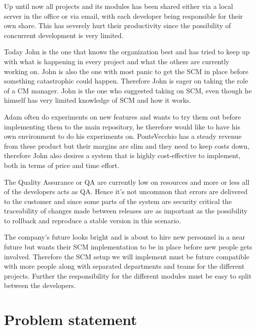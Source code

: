 \documentclass[10pt]{article}
\begin{document}
\noindent Up until now all projects and its modules has been shared either via a local server in the office or via email, with each developer being responsible for their own share. This has severely hurt their productivity since the possibility of concurrent development is very limited. 

\noindent Today John is the one that knows the organization best and has tried to keep up with what is happening in every project and what the others are currently working on. John is also the one with most panic to get the SCM in place before something catastrophic could happen. Therefore John is eager on taking the role of a CM manager. John is the one who suggested taking on SCM, even though he himself has very limited knowledge of SCM and how it works.

\noindent Adam often do experiments on new features and wants to try them out before implementing them to the main repository, he therefore would like to have his own environment to do his experiments on. PonteVecchio has a steady revenue from these product but their margins are slim and they need to keep costs down, therefore John also desires a system that is highly cost-effective to implement, both in terms of price and time effort. 

\noindent The Quality Assurance or QA are currently low on resources and more or less all of the developers acts as QA. Hence it’s not uncommon that errors are delivered to the customer and since some parts of the system are security critical the traceability of changes made between releases are as important as the possibility to rollback and reproduce a stable version in this scenario.

\noindent The company's future looks bright and is about to hire new personnel in a near future but wants their SCM implementation to be in place before new people gets involved. Therefore the SCM setup we will implement must be future compatible with more people along with separated departments and teams for the different projects. Further the responsibility for the different modules must be easy to split between the developers.

\section{Problem statement}
\end{document}
